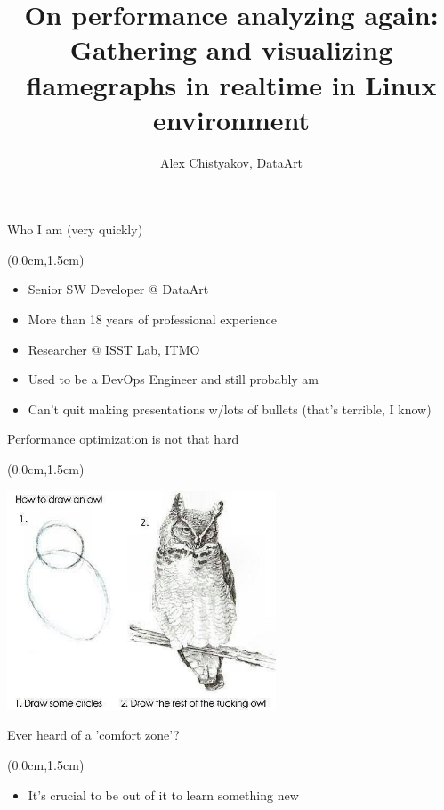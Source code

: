 \documentclass[xetex,14pt,aspectratio=169]{beamer}
\title[Gathering and visualizing flamegraphs in realtime]{On performance analyzing again:\\ {Gathering and visualizing flamegraphs in realtime in Linux environment}}
\author[Alex Chistyakov, DataArt]{Alex Chistyakov, DataArt}
\institute[]{Linux Piter 2016, Russia, SPb.}
\date{}
\begin{document}
\setlength{\fboxsep}{0pt}

\begin{frame}
  \titlepage
\end{frame}

\begin{frame}{Who I am (very quickly)}
\begin{textblock*}{\framewidth-0.8cm}(0.0cm,1.5cm) %
\begin{itemize}
  \item Senior SW Developer @ DataArt
  \item More than 18 years of professional experience
  \item Researcher @ ISST Lab, ITMO
  \item Used to be a DevOps Engineer and still probably am
  \item Can't quit making presentations w/lots of bullets (that's terrible, I know)
\end{itemize}
\end{textblock*}
\end{frame}

\begin{frame}{Performance optimization is not that hard}
\begin{textblock*}{\framewidth-0.8cm}(0.0cm,1.5cm) %
\begin{minipage}{\textwidth}
  \centering
  \includegraphics[width=8cm]{img/owl}
\end{minipage}
\end{textblock*}
\end{frame}

\begin{frame}{Ever heard of a 'comfort zone'?}
\begin{textblock*}{\framewidth-0.8cm}(0.0cm,1.5cm) %
\begin{itemize}
  \item It's crucial to be out of it to learn something new
\end{itemize}
\end{textblock*}
\end{frame}
\end{document}
